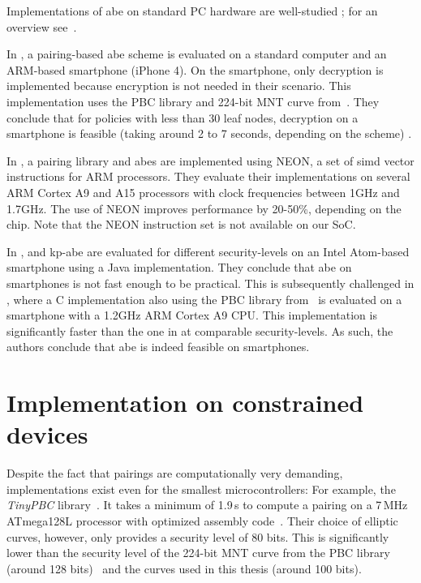 Implementations of \acrshort{abe} on standard PC hardware are well-studied \cite{akinyele_charm_2013,bethencourt_ciphertext-policy_2007,green_functional_nodate}; for an overview see~\cite{zickau_applied_2016}.

In \cite{akinyele_self-protecting_2010}, a pairing-based \acrshort{abe} scheme is evaluated on a standard computer and an ARM-based smartphone (iPhone 4).
On the smartphone, only decryption is implemented because encryption is not needed in their scenario.
This implementation uses the PBC library and 224-bit MNT curve from~\cite{lynn_implementation_2007}.
They conclude that for policies with less than 30 leaf nodes, decryption on a smartphone is feasible (taking around 2 to 7 seconds, depending on the scheme) \cite{akinyele_self-protecting_2010}.

In \cite{sanchez_neon_2013}, a pairing library and \acrshort{abes} are implemented using NEON, a set of \acrshort{simd} vector instructions for ARM processors.
They evaluate their implementations on several ARM Cortex A9 and A15 processors with clock frequencies between 1GHz and 1.7GHz.
The use of NEON improves performance by 20-50\%, depending on the chip.
Note that the NEON instruction set is not available on our SoC. 

In \cite{wang_performance_2014},  and \acrshort{kp-abe} are evaluated for different \glspl{security-level} on an Intel Atom-based smartphone using a Java implementation.
They conclude that \acrshort{abe} on smartphones is not fast enough to be practical.
This is subsequently challenged in \cite{ambrosin_feasibility_2015}, where a C implementation also using the PBC library from~\cite{lynn_implementation_2007} is evaluated on a smartphone with a 1.2GHz ARM Cortex A9 CPU.
This implementation is significantly faster than the one in \cite{wang_performance_2014} at comparable \glspl{security-level}.
As such, the authors conclude that \acrshort{abe} is indeed feasible on smartphones.

\section{Implementation on constrained devices}

Despite the fact that pairings are computationally very demanding, implementations exist even for the smallest microcontrollers:
For example, the \emph{TinyPBC} library~\cite{aranha_tinypbc_nodate}.
It takes a minimum of 1.9\,s to compute a pairing on a 7\,MHz ATmega128L processor with optimized assembly code~\cite{oliveira_tinypbc_2011}. 
Their choice of elliptic curves, however, only provides a security level of 80 bits.
This is significantly lower than the security level of the 224-bit MNT curve from the PBC library (around 128 bits)~\cite{akinyele_self-protecting_2010} and the curves used in this thesis (around 100 bits).

